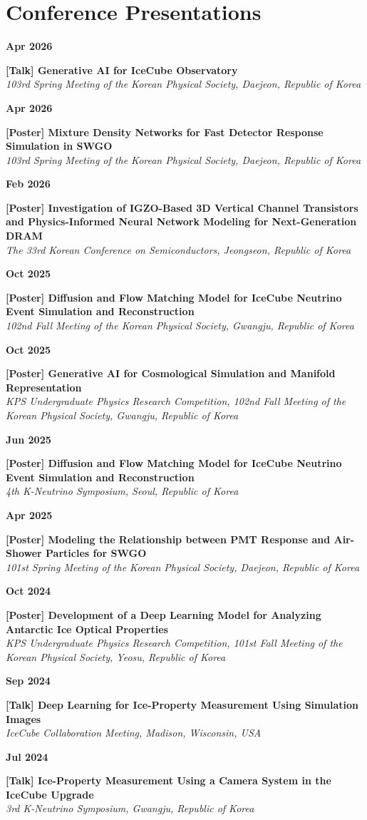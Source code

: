 \documentclass[11pt, a4paper]{article}
\newcommand{\conferenceitem}[3]{%
    \noindent
    \parbox[t]{0.15\textwidth}{{\color{primary}\textbf{#1}}}%
    \hfill
    \parbox[t]{0.83\textwidth}{\textbf{#2}\\[2pt]\textit{#3}}%
    \vspace{8pt}\par
}
\begin{document}
\newpage
\section{Conference Presentations}
\conferenceitem{Apr 2026}{[Talk] Generative AI for IceCube Observatory}{103rd Spring Meeting of the Korean Physical Society, Daejeon, Republic of Korea}

\conferenceitem{Apr 2026}{[Poster] Mixture Density Networks for Fast Detector Response Simulation in SWGO}{103rd Spring Meeting of the Korean Physical Society, Daejeon, Republic of Korea}

\conferenceitem{Feb 2026}{[Poster] Investigation of IGZO-Based 3D Vertical Channel Transistors and Physics-Informed Neural Network Modeling for Next-Generation DRAM}{The 33rd Korean Conference on Semiconductors, Jeongseon, Republic of Korea}

\conferenceitem{Oct 2025}{[Poster] Diffusion and Flow Matching Model for IceCube Neutrino Event Simulation and Reconstruction}{102nd Fall Meeting of the Korean Physical Society, Gwangju, Republic of Korea}

\conferenceitem{Oct 2025}{[Poster] Generative AI for Cosmological Simulation and Manifold Representation}{KPS Undergraduate Physics Research Competition, 102nd Fall Meeting of the Korean Physical Society, Gwangju, Republic of Korea}

\conferenceitem{Jun 2025}{[Poster] Diffusion and Flow Matching Model for IceCube Neutrino Event Simulation and Reconstruction}{4th K-Neutrino Symposium, Seoul, Republic of Korea}

\conferenceitem{Apr 2025}{[Poster] Modeling the Relationship between PMT Response and Air-Shower Particles for SWGO}{101st Spring Meeting of the Korean Physical Society, Daejeon, Republic of Korea}

\conferenceitem{Oct 2024}{[Poster] Development of a Deep Learning Model for Analyzing Antarctic Ice Optical Properties}{KPS Undergraduate Physics Research Competition, 101st Fall Meeting of the Korean Physical Society, Yeosu, Republic of Korea}

\conferenceitem{Sep 2024}{[Talk] Deep Learning for Ice-Property Measurement Using Simulation Images}{IceCube Collaboration Meeting, Madison, Wisconsin, USA}

\conferenceitem{Jul 2024}{[Talk] Ice-Property Measurement Using a Camera System in the IceCube Upgrade}{3rd K-Neutrino Symposium, Gwangju, Republic of Korea}
\end{document}
